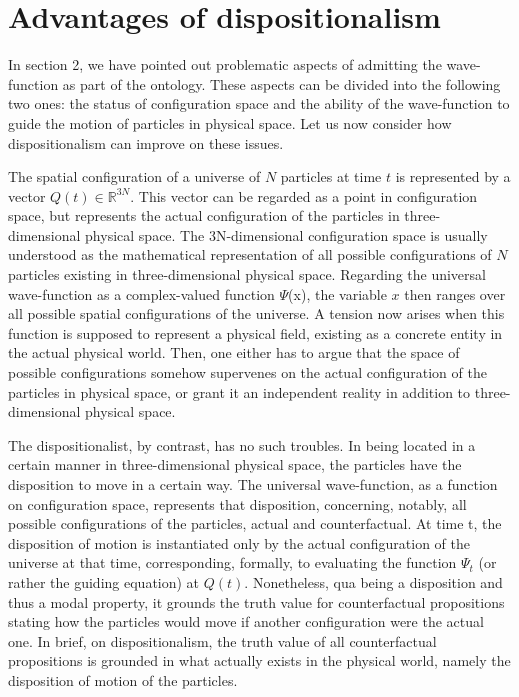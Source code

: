 \documentclass[12pt,a4paper]{article}
\newcommand{\R}{\mathbb R}
\theoremstyle{definition}
\begin{document}
\section{Advantages of dispositionalism}

In section 2, we have pointed out problematic aspects of admitting the wave-function as part of the ontology. These aspects can be divided into the following two ones: the status of configuration space and the ability of the wave-function to guide the motion of particles in physical space. Let us now consider how dispositionalism can improve on these issues.

The spatial configuration of a universe of $N$ particles at time $t$ is represented by a vector $Q(t) \in \R^{3N}$. This vector can be regarded as a point in configuration space, but represents the actual configuration of the particles in three-dimensional physical space. The 3N-dimensional configuration space is usually understood as the mathematical representation of all possible configurations of $N$ particles existing in three-dimensional physical space. Regarding the universal wave-function as a complex-valued function $\Psi$(x), the variable $x$ then ranges over all possible spatial configurations of the universe. A tension now arises when this function is supposed to represent a physical field, existing as a concrete entity in the actual physical world. Then, one either has to argue that the space of possible configurations somehow supervenes on the actual configuration of the particles in physical space, or grant it an independent reality in addition to three-dimensional physical space.

The dispositionalist, by contrast, has no such troubles. In being located in a certain manner in three-dimensional physical space, the particles have the disposition to move in a certain way. The universal wave-function, as a function on configuration space, represents that disposition, concerning, notably, all possible configurations of the particles, actual and counterfactual. At time t, the disposition of motion is instantiated only by the actual configuration of the universe at that time, corresponding, formally, to evaluating the function $\Psi_t$ (or rather the guiding equation) at $Q(t)$. Nonetheless, qua being a disposition and thus a modal property, it grounds the truth value for counterfactual propositions stating how the particles would move if another configuration were the actual one. In brief, on dispositionalism, the truth value of all counterfactual propositions is grounded in what actually exists in the physical world, namely the disposition of motion of the particles.
\end{document}
